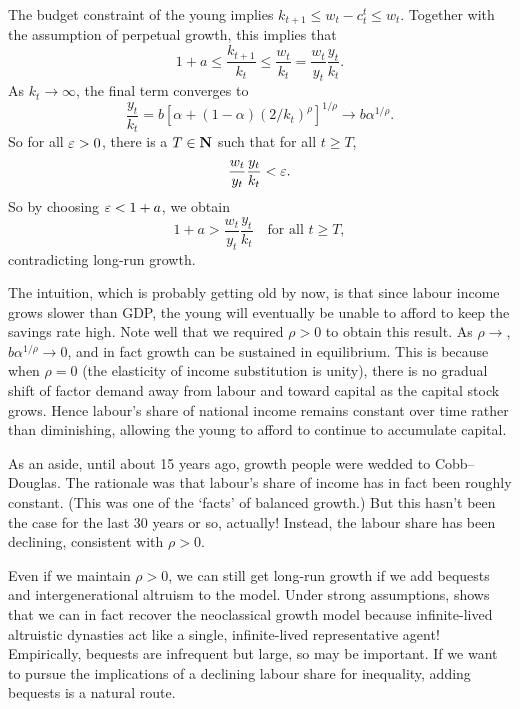 \documentclass[11pt,letterpaper,reqno,oneside]{article}
\begin{document}
The budget constraint of the young implies $k_{t+1} \leq w_t - c^t_t \leq w_t$. Together with the assumption of perpetual growth, this implies that
%
\begin{equation*}
	1 + a
	\leq \frac{k_{t+1}}{k_t}
	\leq \frac{w_t}{k_t}
	= \frac{w_t}{y_t} \frac{y_t}{k_t} .
\end{equation*}
%
As $k_t \to \infty$, the final term converges to
%
\begin{equation*}
	\frac{y_t}{k_t} = b \left[ \alpha 
	+ (1-\alpha) (2/k_t)^\rho \right]^{1/\rho} 
	\to b \alpha^{1/\rho} .
\end{equation*}
%
So for all $\varepsilon>0$, there is a $T \in \mathbf{N}$ such that for all $t \geq T$,
%
\begin{equation*}
	\frac{w_t}{y_t} \frac{y_t}{k_t}
	< \varepsilon .
\end{equation*}
%
So by choosing $\varepsilon < 1+a$, we obtain
%
\begin{equation*}
	1+a > \frac{w_t}{y_t} \frac{y_t}{k_t} 
	\quad\text{for all $t \geq T$} ,
\end{equation*}
%
contradicting long-run growth.


The intuition, which is probably getting old by now, is that since labour income grows slower than GDP, the young will eventually be unable to afford to keep the savings rate high. Note well that we required $\rho>0$ to obtain this result. As $\rho \to$, $b \alpha^{1/\rho} \to 0$, and in fact growth can be sustained in equilibrium. This is because when $\rho=0$ (the elasticity of income substitution is unity), there is no gradual shift of factor demand away from labour and toward capital as the capital stock grows. Hence labour's share of national income remains constant over time rather than diminishing, allowing the young to afford to continue to accumulate capital.

As an aside, until about 15 years ago, growth people were wedded to Cobb--Douglas. The rationale was that labour's share of income has in fact been roughly constant. (This was one of the \textcite{Kaldor1957} `facts' of balanced growth.) But this hasn't been the case for the last 30 years or so, actually! Instead, the labour share has been declining, consistent with $\rho>0$.

Even if we maintain $\rho>0$, we can still get long-run growth if we add bequests and intergenerational altruism to the model. Under strong assumptions, \textcite{Barro1974} shows that we can in fact recover the neoclassical growth model because infinite-lived altruistic dynasties act like a single, infinite-lived representative agent! Empirically, bequests are infrequent but large, so may be important. If we want to pursue the implications of a declining labour share for inequality, adding bequests is a natural route.
\end{document}
